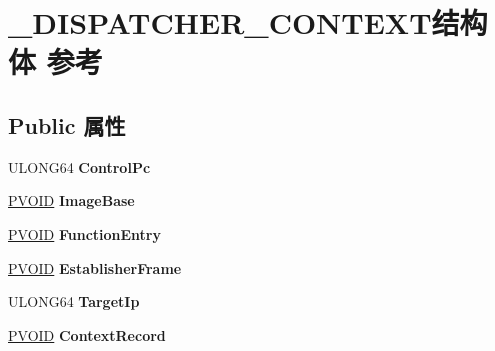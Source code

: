 \hypertarget{struct___d_i_s_p_a_t_c_h_e_r___c_o_n_t_e_x_t}{}\section{\+\_\+\+D\+I\+S\+P\+A\+T\+C\+H\+E\+R\+\_\+\+C\+O\+N\+T\+E\+X\+T结构体 参考}
\label{struct___d_i_s_p_a_t_c_h_e_r___c_o_n_t_e_x_t}
\subsection*{Public 属性}
\begin{DoxyCompactItemize}
\item 
\mbox{\label{struct___d_i_s_p_a_t_c_h_e_r___c_o_n_t_e_x_t_a3ffb7431a1141940b709c5f2a920b46e}} 
U\+L\+O\+N\+G64 {\bfseries Control\+Pc}
\item 
\mbox{\label{struct___d_i_s_p_a_t_c_h_e_r___c_o_n_t_e_x_t_af89c1e7a44cafb2f5dafc1ef53a7d619}} 
\hyperlink{interfacevoid}{P\+V\+O\+ID} {\bfseries Image\+Base}
\item 
\mbox{\label{struct___d_i_s_p_a_t_c_h_e_r___c_o_n_t_e_x_t_a957d27b837db920c91369bb9531a0137}} 
\hyperlink{interfacevoid}{P\+V\+O\+ID} {\bfseries Function\+Entry}
\item 
\mbox{\label{struct___d_i_s_p_a_t_c_h_e_r___c_o_n_t_e_x_t_abb494cd7db6d147ddcc2c694e81f1e35}} 
\hyperlink{interfacevoid}{P\+V\+O\+ID} {\bfseries Establisher\+Frame}
\item 
\mbox{\label{struct___d_i_s_p_a_t_c_h_e_r___c_o_n_t_e_x_t_a68cce4873113f30093105bd3433702fd}} 
U\+L\+O\+N\+G64 {\bfseries Target\+Ip}
\item 
\mbox{\label{struct___d_i_s_p_a_t_c_h_e_r___c_o_n_t_e_x_t_a1ab3e37a3879550e8846ea97f8202536}} 
\hyperlink{interfacevoid}{P\+V\+O\+ID} {\bfseries Context\+Record}
\item 
\mbox{\label{struct___d_i_s_p_a_t_c_h_e_r___c_o_n_t_e_x_t_a749347b6e4f5e50762752be25582be4c}} 

\end{DoxyCompactItemize}
